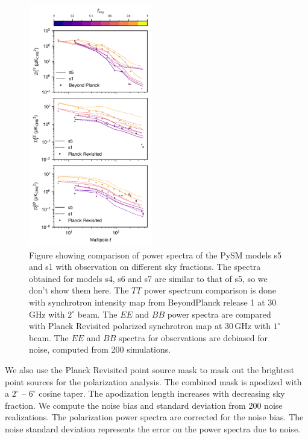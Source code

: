 \documentclass[twocolumn]{aastex631}
\begin{document}
\begin{figure}
   \centering
   \includegraphics[width=0.48\textwidth]{figures/Dlcomp_PySM3-4_s5_vs_BPPR_SYNC.png}
    \caption{Figure showing comparison of power spectra of the PySM models s5 and s1 with observation on different sky fractions. The spectra obtained for models s4, s6 and s7 are similar to that of s5, so we don't show them here. The $TT$ power spectrum comparison is done with synchrotron intensity map from BeyondPlanck release 1 \citep{Andersen:2023} at 30 GHz with $2^\circ$ beam. The $EE$ and $BB$ power spectra are compared with Planck Revisited \citep{Delabrouille:2024} polarized synchrotron map at 30\,GHz with $1^\circ$ beam. The $EE$ and $BB$ spectra for observations are debiased for noise, computed from 200 simulations.}
   \label{fig:Dl_sync_galmask}
\end{figure}

We also use the Planck Revisited point source mask to mask out the brightest point sources for the polarization analysis. The combined mask is apodized with a $2^\circ$ -- $6^\circ$ cosine taper. The apodization length increases with decreasing sky fraction. We compute the noise bias and standard deviation from 200 noise realizations. The polarization power spectra are corrected for the noise bias. The noise standard deviation represents the error on the power spectra due to noise.

\end{document}
